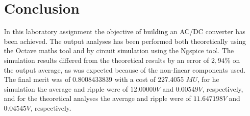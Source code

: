 \section{Conclusion}
\label{sec:conclusion}

In this laboratory assignment the objective of building an AC/DC converter has been
achieved. The output analyses has been performed both
theoretically using the Octave maths tool and by circuit simulation using the
Ngspice tool. The simulation results differed from the theoretical results
by an error of $2,94\%$ on the output average, as was expected because of the non-linear components used. The final merit was of 0.8008433839 with a cost of 227.4055 $MU$, for he simulation the average and ripple were of $12.00000 V$ and $0.00549 V$, respectively, and for the theoretical analyses the average and ripple were of $11.647198 V$ and $0.04545 V$, respectively.
